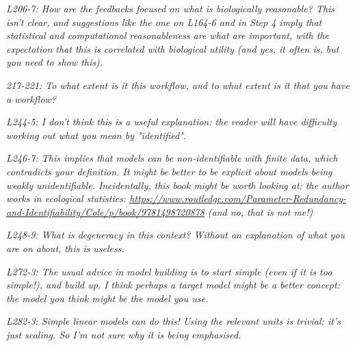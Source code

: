 \documentclass[11pt,a4paper]{article}
\begin{document}
\emph{L206-7: How are the feedbacks focused on what is biologically reasonable? This isn't clear, and suggestions like the one on L164-6 and in Step 4 imply that statistical and computational reasonableness are what are important, with the expectation that this is correlated with biological utility (and yes, it often is, but you need to show this).}


\emph{217-221: To what extent is it this workflow, and to what extent is it that you have a workflow?}

\emph{L244-5: I don't think this is a useful explanation: the reader will have difficulty working out what you mean by "identified".}

\emph{L246-7: This implies that models can be non-identifiable with finite data, which contradicts your definition. It might be better to be explicit about models being weakly unidentifiable. Incidentally, this book might be worth looking at: the author works in ecological statistics: \url{https://www.routledge.com/Parameter-Redundancy-and-Identifiability/Cole/p/book/9781498720878} (and no, that is not me!)}

\emph{L248-9: What is degeneracy in this context? Without an explanation of what you are on about, this is useless.}

\emph{L272-3: The usual advice in model building is to start simple (even if it is too simple!), and build up. I think perhaps a target model might be a better concept: the model you think might be the model you use.} 

\emph{L282-3: Simple linear models can do this! Using the relevant units is trivial: it's just scaling. So I'm not sure why it is being emphasised.}
\end{document}
